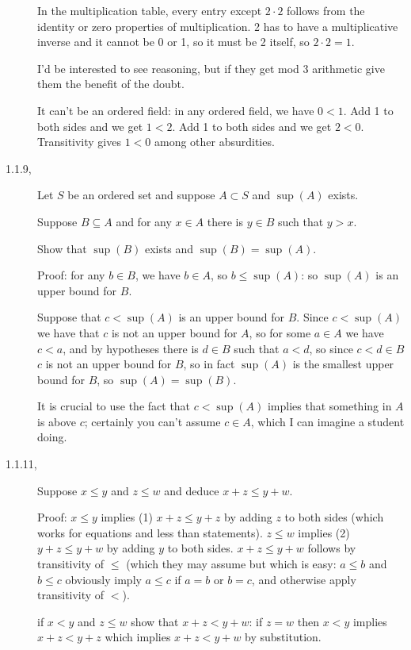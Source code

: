 \documentclass[12pt]{article}
\begin{document}
\begin{description}
In the multiplication table, every entry except $2 \cdot 2$ follows from the identity or zero properties of multiplication.  2 has to have a multiplicative inverse and it cannot be 0 or 1, so it must be 2 itself, so $2 \cdot 2 = 1$.

I'd be interested to see reasoning, but if they get mod 3 arithmetic give them the benefit of the doubt.

It can't be an ordered field:  in any ordered field, we have $0<1$.  Add 1 to both sides and we get $1<2$.  Add 1 to both sides and we get $2<0$.  Transitivity gives $1<0$ among other absurdities.

\item[ 1.1.9,]  Let $S$ be an ordered set and suppose $A \subset S$ and $\sup(A)$ exists.

Suppose $B \subseteq A$ and for any $x \in A$ there is $y \in B$ such that $y>x$.

Show that $\sup(B)$ exists and $\sup(B)=\sup(A)$.

Proof:  for any $b \in B$, we have $b \in A$, so $b \leq \sup(A)$:  so $\sup(A)$ is an upper bound for $B$.

Suppose that $c < \sup(A)$ is an upper bound for $B$.  Since $c < \sup(A)$ we have that $c$ is not an upper bound for $A$,
so for some $a \in A$ we have $c <a$, and by hypotheses there is $d \in B$ such that $a <d$, so since $c <d \in B$ $c$ is not an upper bound for
$B$, so in fact $\sup(A)$ is the smallest upper bound for $B$, so $\sup(A)=\sup(B)$.

It is crucial to use the fact that $c<\sup(A)$ implies that something in $A$ is above $c$;  certainly you can't assume $c \in A$, which I can imagine a student doing.

\item[ 1.1.11,]

Suppose $x \leq y$ and $z \leq w$ and deduce $x +z \leq y+w$.

Proof: $x \leq y$ implies (1) $x+z \leq y+z$ by adding $z$ to both sides (which works for equations and less than statements).
$z \leq w$ implies (2) $y+z \leq y+w$  by adding $y$ to both sides.  $x+z \leq y+w$ follows by transitivity of $\leq$ (which they may assume but which is easy:
$a \leq b$ and $b \leq c$ obviously imply $a \leq c$ if $a=b$ or $b=c$, and otherwise apply transitivity of $<$).

if $x < y$ and $z \leq w$ show that $x+z < y+w$:  if $z=w$ then $x<y$ implies $x+z < y+z$ which implies $x+z < y+w$ by substitution.


\end{description}
\end{document}
